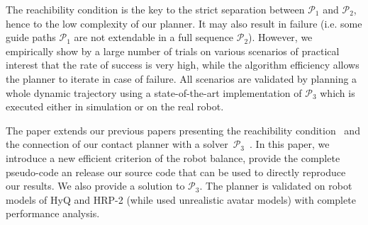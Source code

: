 The reachibility condition is the key to the strict separation between $\mathcal{P}_1$ and $\mathcal{P}_2$, hence to the low complexity of our planner.
It  may also result in failure (i.e. some guide paths $\mathcal{P}_1$ are not extendable in a full sequence $\mathcal{P}_2$).
However, we empirically show by a large number of trials on various scenarios of practical interest that the rate of success is very high, while the algorithm efficiency allows the planner to iterate in case of failure.
All scenarios are validated by planning a whole dynamic trajectory using a state-of-the-art implementation of $\mathcal{P}_3$ which is executed either in simulation or on the real robot.

The paper extends our previous papers presenting the reachibility condition~\cite{tonneauisrr15} and the connection of our contact planner with a solver~$\mathcal{P}_3$~\cite{Carpentier2016}.
In this paper, we introduce a new efficient criterion of the robot balance, provide the complete pseudo-code an release our source code that can be used to directly reproduce our results.
We also provide a solution to $\mathcal{P}_3$.
The planner is validated on robot models of HyQ and HRP-2 (while \cite{tonneauisrr15} used unrealistic avatar models) with complete performance analysis.


%




